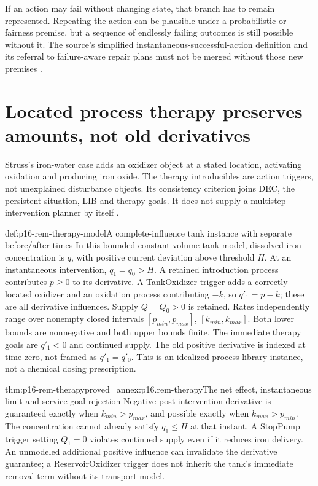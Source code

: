 If an action may fail without changing state, that branch has to remain
represented. Repeating the action can be plausible under a probabilistic
or fairness premise, but a sequence of endlessly failing outcomes is still
possible without it. The source's simplified instantaneous-successful-action
definition and its referral to failure-aware repair plans must not be merged
without those new premises \cite[pp.~447--449]{Struss2008ModelBasedProblemSolving}.

\section{Located process therapy preserves amounts, not old derivatives}
\label{sec:p16-rem-therapy}

Struss's iron-water case adds an oxidizer object at a stated location,
activating oxidation and producing iron oxide. The therapy introducibles
are action triggers, not unexplained disturbance objects. Its consistency
criterion joins DEC, the persistent situation, LIB and therapy goals.
It does not supply a multistep intervention planner by itself
\cite[Definition~10.21, pp.~453--454]{Struss2008ModelBasedProblemSolving}.

\begin{hbdefinition}{def:p16-rem-therapy-model}{A complete-influence tank instance with separate before/after times}
In this bounded constant-volume tank model, dissolved-iron concentration
is \(q\), with positive current deviation above threshold \(H\).
At an instantaneous intervention, \(q_1=q_0>H\). A retained introduction
process contributes \(p\ge0\) to its derivative. A TankOxidizer trigger
adds a correctly located oxidizer and an oxidation process contributing
\(-k\), so \(q'_1=p-k\); these are all derivative influences.
Supply \(Q=Q_0>0\) is retained. Rates independently range over nonempty
closed intervals \([p_{min},p_{max}]\), \([k_{min},k_{max}]\).
Both lower bounds are nonnegative and both upper bounds finite.
The immediate therapy goals are \(q'_1<0\) and continued supply.
The old positive derivative is indexed at time zero, not framed as
\(q'_1=q'_0\). This is an idealized process-library instance, not a
chemical dosing prescription.
\end{hbdefinition}

\begin{hbtheorem}{thm:p16-rem-therapy}{proved=annex:p16.rem-therapy}{The net effect, instantaneous limit and service-goal rejection}
Negative post-intervention derivative is guaranteed exactly when
\(k_{min}>p_{max}\), and possible exactly when \(k_{max}>p_{min}\).
The concentration cannot already satisfy \(q_1\le H\) at that instant.
A StopPump trigger setting \(Q_1=0\) violates continued supply even if
it reduces iron delivery. An unmodeled additional positive influence can
invalidate the derivative guarantee; a ReservoirOxidizer trigger does not
inherit the tank's immediate removal term without its transport model.
\end{hbtheorem}


